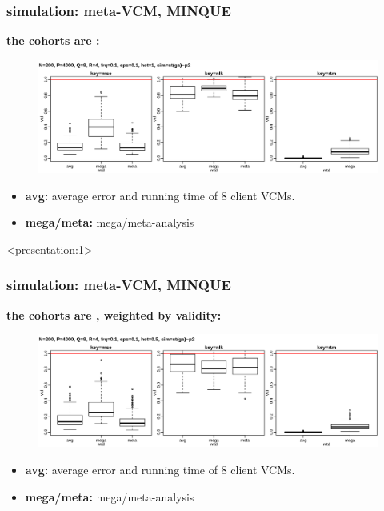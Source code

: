 \documentclass{beamer}
\begin{document}
\begin{frame} \frametitle{simulation: meta-VCM, MINQUE}
  \textbf{the cohorts are \color{red}{heterogeneous}:} \\
  \begin{figure}
    \centering \includegraphics[width=.95\linewidth]{img/met_het_stt_mnq_ssz}
  \end{figure}
  \textbf{\color{blue}{inner plot: strategies, from left to right:}}
  \begin{itemize}
  \item \textbf{avg:} average error and running time of 8 client VCMs.
  \item \textbf{mega/meta:} mega/meta-analysis
  \end{itemize}
\end{frame}
\begin{frame}<presentation:1> %
  \frametitle{simulation: meta-VCM, MINQUE} %
  \textbf{the cohorts are \color{red}{heterogeneous}, weighted by validity:} \\
  \begin{figure}
    \centering \includegraphics[width=.95\linewidth]{img/met_het_stt_mnq_cyh}
  \end{figure}
  \textbf{\color{blue}{inner plot: strategies, from left to right:}}
  \begin{itemize}
  \item \textbf{avg:} average error and running time of 8 client VCMs.
  \item \textbf{mega/meta:} mega/meta-analysis
  \end{itemize}
\end{frame}
\end{document}
